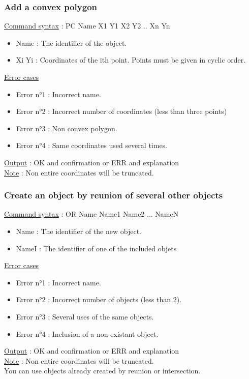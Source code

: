 \documentclass[a4paper, 12pts]{article}
\begin{document}
		\subsubsection{Add a convex polygon}
			\uline{Command syntax} :
			PC Name X1 Y1 X2 Y2 .. Xn Yn
			\begin{itemize}
				\item Name : The identifier of the object.
				\item Xi Yi : Coordinates of the ith point. Points must be given in cyclic order.
			\end{itemize}
			\uline{Error cases}
			\begin{itemize}
				\item Error n°1 : Incorrect name.
				\item Error n°2 : Incorrect number of coordinates (less than three points)
				\item Error n°3 : Non convex polygon.
				\item Error n°4 : Same coordinates used several times.
			\end{itemize}
			\uline{Output} : OK and confirmation or ERR and explanation\\
			\uline{Note} : 
			Non entire coordinates will be truncated.

		\subsubsection{Create an object by reunion of several other objects}
			\uline{Command syntax} :
			OR Name Name1 Name2 ... NameN
			\begin{itemize}
				\item Name : The identifier of the new object.
				\item NameI : The identifier of one of the included objets
			\end{itemize}
			\uline{Error cases}
			\begin{itemize}
				\item Error n°1 : Incorrect name.
				\item Error n°2 : Incorrect number of objects (less than 2).
				\item Error n°3 : Several uses of the same objects.
				\item Error n°4 : Inclusion of a non-existant object.
			\end{itemize}
			\uline{Output} : OK and confirmation or ERR and explanation\\
			\uline{Note} : 
			Non entire coordinates will be truncated.\\
			You can use objects already created by reunion or intersection.
\end{document}
